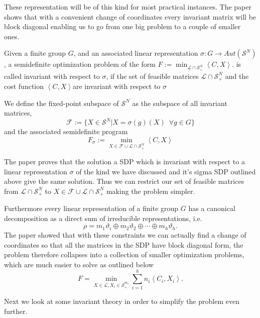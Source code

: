 \documentclass[]{article}
\begin{document}
These representation will be of this kind for most practical instances. The paper shows that with a convenient change of coordinates every 
invariant matrix will be block diagonal enabling us to go from one big problem to a couple of smaller ones. 
\begin{definition}
    Given a finite group $G$, and an associated linear representation $\sigma:G\rightarrow Aut(\mathcal{S}^N)$, a semidefinite
    optimization problem of the form $F:=\min_{\mathcal{L}\cap \mathcal{S}_+^N}\left<C,X\right>.$ is called invariant with 
    respect to $\sigma$, if the set of feasible matrices $\mathcal{L}\cap \mathcal{S}_+^N$ and the cost function $\left<C,X\right>$are invariant with respect to $\sigma$
\end{definition}
\begin{definition}
    We define the fixed-point subspace of $\mathcal{S}^N$ as the subspace of all invariant matrices, 
    \[\mathcal{F} := \{X\in\mathcal{S}^N | X= \sigma(g)(X)\,\,\, \forall g \in G\}\] 
    and the associated semidefinite program 
    \[F_\sigma := \min_{X\in\mathcal{F}\cup\mathcal{L}\cap \mathcal{S}_+^N } \left<C,X\right>\]
\end{definition}

The paper proves that the solution a SDP which is invariant with respect to a linear representation $\sigma$ of the kind we have discussed and it's sigma SDP outlined above give the same solution. 
Thus we can restrict our set of feasible matrices from $\mathcal{L}\cap \mathcal{S}_+^N$ to $ X\in\mathcal{F}\cup\mathcal{L}\cap \mathcal{S}_+^N$ making the problem simpler.

Furthermore every linear representation of a finite group $G$ has a canonical decomposition as a direct sum of irreducible representations, i.e.
\[\rho = m_1\vartheta_i\oplus m_2\vartheta_2 \oplus \cdots \oplus m_h\vartheta_h.\]
The paper showed that with these constraints we can actually find a change of coordinates so that all the matrices 
in the SDP have block diagonal form, the problem therefore collapses into a collection of smaller 
optimization problems, which are much easier to solve as outlined below 
\[F = \min_{X\in\mathcal{L}, X_i \in \mathcal{S}_+^{m_i} }\sum_{i=1}^{h} n_i\left<C_i,X_i\right>.\]

Next we look at some invariant theory in order to simplify the problem even further. 
\end{document}

